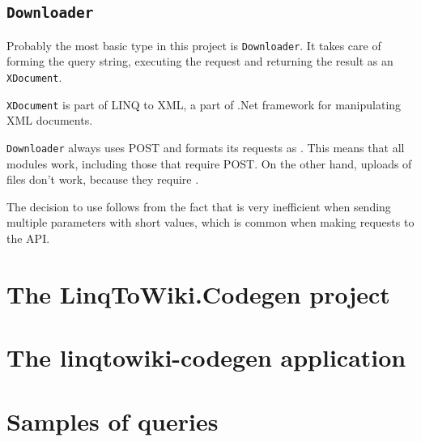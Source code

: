 \subsection{\lstinline{Downloader}}

Probably the most basic type in this project is \lstinline{Downloader}.
It takes care of forming the query string, executing the request and
returning the result as an \lstinline{XDocument}.

\lstinline{XDocument} is part of LINQ to XML, a part of .Net framework for manipulating XML documents.

\lstinline{Downloader} always uses POST and formats its requests as .
This means that all modules work, including those that require POST.
On the other hand, uploads of files don't work, because they require .

The decision to use  follows from the fact that
 is very inefficient when sending multiple parameters with short values,
which is common when making requests to the API.


\section{The LinqToWiki.Codegen project}

\section{The linqtowiki-codegen application}

\section{Samples of queries}